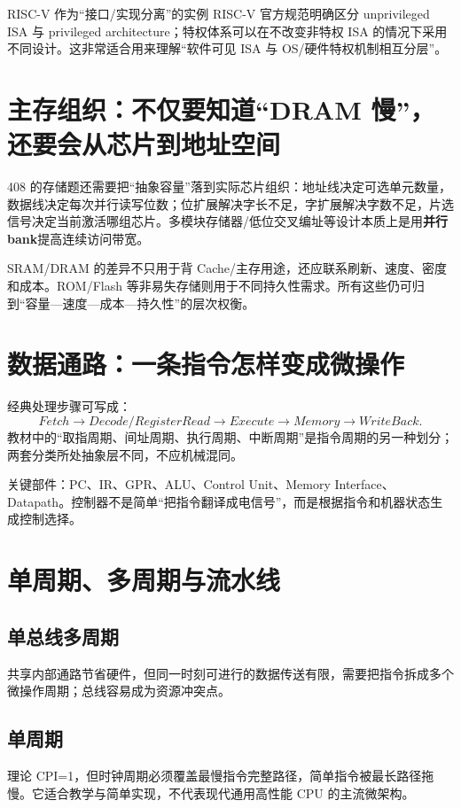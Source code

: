 \documentclass[11pt,a4paper,openany]{ctexbook}
\newcommand{\key}[1]{\textbf{\color{deep}#1}}
\begin{document}
\begin{modernbox}{RISC-V 作为“接口/实现分离”的实例}
RISC-V 官方规范明确区分 unprivileged ISA 与 privileged architecture；特权体系可以在不改变非特权 ISA 的情况下采用不同设计。这非常适合用来理解“软件可见 ISA 与 OS/硬件特权机制相互分层”。
\end{modernbox}


\section{主存组织：不仅要知道“DRAM 慢”，还要会从芯片到地址空间}
408 的存储题还需要把“抽象容量”落到实际芯片组织：地址线决定可选单元数量，数据线决定每次并行读写位数；位扩展解决字长不足，字扩展解决字数不足，片选信号决定当前激活哪组芯片。多模块存储器/低位交叉编址等设计本质上是用\key{并行 bank}提高连续访问带宽。

SRAM/DRAM 的差异不只用于背 Cache/主存用途，还应联系刷新、速度、密度和成本。ROM/Flash 等非易失存储则用于不同持久性需求。所有这些仍可归到“容量—速度—成本—持久性”的层次权衡。

\section{数据通路：一条指令怎样变成微操作}
经典处理步骤可写成：
\[
Fetch\rightarrow Decode/RegisterRead\rightarrow Execute\rightarrow Memory\rightarrow WriteBack.
\]
教材中的“取指周期、间址周期、执行周期、中断周期”是指令周期的另一种划分；两套分类所处抽象层不同，不应机械混同。

关键部件：PC、IR、GPR、ALU、Control Unit、Memory Interface、Datapath。控制器不是简单“把指令翻译成电信号”，而是根据指令和机器状态生成控制选择。

\section{单周期、多周期与流水线}
\subsection{单总线多周期}
共享内部通路节省硬件，但同一时刻可进行的数据传送有限，需要把指令拆成多个微操作周期；总线容易成为资源冲突点。

\subsection{单周期}
理论 CPI=1，但时钟周期必须覆盖最慢指令完整路径，简单指令被最长路径拖慢。它适合教学与简单实现，不代表现代通用高性能 CPU 的主流微架构。
\end{document}
